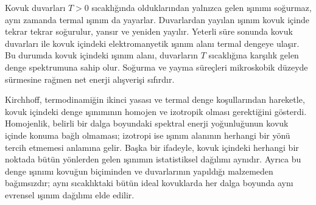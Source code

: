 \documentclass[00_kitap.tex]{subfiles}
\begin{document}
Kovuk duvarları $T>0$ sıcaklığında olduklarından yalnızca gelen ışınımı soğurmaz, aynı zamanda termal  ışınım da yayarlar. Duvarlardan yayılan ışınım kovuk içinde tekrar tekrar soğurulur, yansır ve yeniden yayılır. Yeterli süre sonunda kovuk duvarları ile kovuk içindeki elektromanyetik ışınım alanı termal dengeye ulaşır. Bu durumda kovuk içindeki ışınım alanı, duvarların $T$ sıcaklığına karşılık gelen denge spektrumuna sahip olur. Soğurma ve yayma süreçleri mikroskobik düzeyde sürmesine rağmen net enerji alışverişi sıfırdır.


Kirchhoff, termodinamiğin ikinci yasası ve termal denge koşullarından hareketle, kovuk içindeki denge ışınımının homojen ve izotropik olması gerektiğini gösterdi. Homojenlik, belirli bir dalga boyundaki spektral enerji yoğunluğunun kovuk içinde konuma bağlı olmaması; izotropi ise ışınım alanının herhangi bir yönü tercih etmemesi anlamına gelir. Başka bir ifadeyle, kovuk içindeki herhangi bir noktada bütün yönlerden gelen ışınımın istatistiksel dağılımı aynıdır. Ayrıca bu denge ışınımı kovuğun biçiminden ve duvarlarının yapıldığı malzemeden bağımsızdır; aynı sıcaklıktaki bütün ideal kovuklarda her dalga boyunda aynı evrensel ışınım dağılımı elde edilir.







\end{document}
